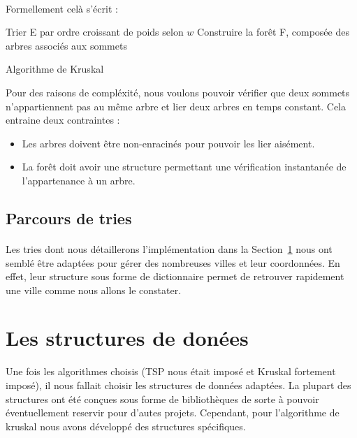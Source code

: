 \documentclass[a4paper]{article}
\begin{document}
\paragraph*{}
Formellement celà s'écrit :

\medskip

\begin{algorithm}[H]
\SetAlgoLined
{}
Trier E par ordre croissant de poids selon $w$\;
Construire la forêt F, composée des arbres associés aux sommets\;
\caption{Algorithme de Kruskal}
\end{algorithm}

\medskip

Pour des raisons de compléxité, nous voulons pouvoir vérifier que deux sommets n'appartiennent pas au même arbre et lier deux arbres en temps constant. Cela entraine deux contraintes :
\begin{itemize}
\item Les arbres doivent être non-enracinés pour pouvoir les lier aisément.
\item La forêt doit avoir une structure permettant une vérification instantanée de l'appartenance à un arbre.
\end{itemize}

\subsection{Parcours de tries}

\paragraph*{}Les tries dont nous détaillerons l'implémentation dans la Section~\ref{se:structures} nous ont semblé être adaptées pour gérer des nombreuses villes et leur coordonnées. En effet, leur structure sous forme de dictionnaire permet de retrouver rapidement une ville comme nous allons le constater.

\section{Les structures de donées}
\label{se:structures}

Une fois les algorithmes choisis (TSP nous était imposé et Kruskal fortement imposé), il nous fallait choisir les structures de données adaptées. La plupart des structures ont été conçues sous forme de bibliothèques de sorte à pouvoir éventuellement reservir pour d'autes projets. Cependant, pour l'algorithme de kruskal nous avons développé des structures spécifiques.
\end{document}
